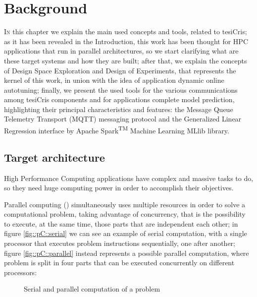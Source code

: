 \chapter{Background}\label{back}

\lettrine{I}{n} this chapter we explain the main used concepts and tools, related to tesiCris; as it has been revealed in the Introduction, this work has been thought for HPC applications that run in parallel architectures, so we start clarifying what are these target systems and how they are built; after that, we explain the concepts of Design Space Exploration and Design of Experiments, that represents the kernel of this work, in union with the idea of application dynamic online autotuning; finally, we present the used tools for the various communications among tesiCris components and for applications complete model prediction, highlighting their principal characteristics and features: the Message Queue Telemetry Transport (MQTT) messaging protocol and the Generalized Linear Regression interface by Apache Spark\textsuperscript{TM} Machine Learning MLlib library.

\section{Target architecture}

High Performance Computing applications have complex and massive tasks to do, so they need huge computing power in order to accomplish their objectives.

Parallel computing (\cite{barney2012introduction}) simultaneously uses multiple resources in order to solve a computational problem, taking advantage of concurrency, that is the possibility to execute, at the same time, those parts that are independent each other; in figure \ref{fig::pC::serial} we can see an example of serial computation, with a single processor that executes problem instructions sequentially, one after another; figure \ref{fig::pC::parallel} instead represents a possible parallel computation, where problem is split in four parts that can be executed concurrently on different processors:

\begin{figure}[H]

    \centering

    \quad
    
    \caption{Serial and parallel computation of a problem}

\end{figure}

